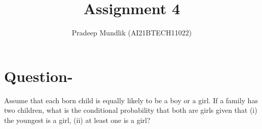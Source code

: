 \documentclass[journal,12pt,twocolumn]{IEEEtran}
\begin{document}
\makeatletter
{}
\makeatother
\let\StandardTheFigure\thefigure{}
\let\vec\mathbf{}
\renewcommand{\thefigure}{\theproblem}
\def\putbox#1#2#3{\makebox[0in][l]{\makebox[#1][l]{}\raisebox{\baselineskip}[0in][0in]{\raisebox{#2}[0in][0in]{#3}}}}
\def\rightbox#1{\makebox[0in][r]{#1}}
\def\centbox#1{\makebox[0in]{#1}}
\def\topbox#1{\raisebox{-\baselineskip}[0in][0in]{#1}}
\def\midbox#1{\raisebox{-0.5\baselineskip}[0in][0in]{#1}}
\vspace{3cm}
\title{Assignment 4}
\author{Pradeep Mundlik (AI21BTECH11022)}
\maketitle
\section{Question-}
    Assume that each born child is equally likely to be a boy or a girl. If a family has two children, 
    what is the conditional probability that both are girls given that (i) the youngest is a girl, (ii) at least one is a girl?   
    
\end{document}
